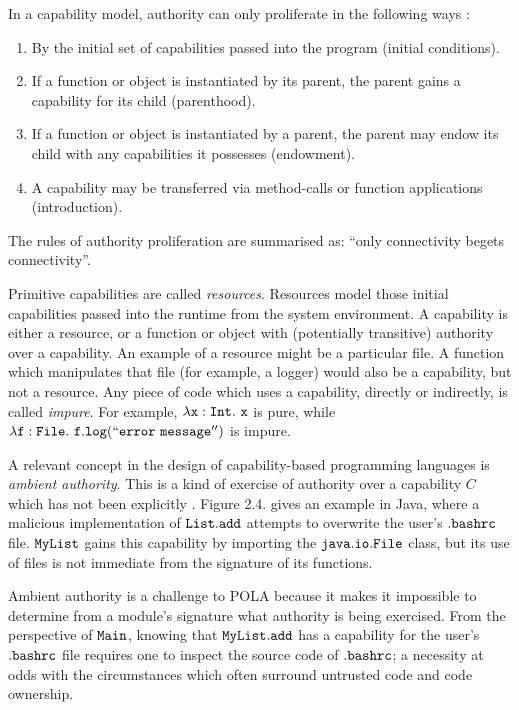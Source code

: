 In a capability model, authority can only proliferate in the following ways \cite{miller06}:

\begin{enumerate}
	\item By the initial set of capabilities passed into the program (initial conditions).
	\item If a function or object is instantiated by its parent, the parent gains a capability for its child (parenthood).
	\item If a function or object is instantiated by a parent, the parent may endow its child with any capabilities it possesses (endowment).
	\item A capability may be transferred via method-calls or function applications (introduction).
\end{enumerate}

The rules of authority proliferation are summarised as: ``only connectivity begets connectivity''.

Primitive capabilities are called \textit{resources}. Resources model those initial capabilities passed into the runtime from the system environment. A capability is either a resource, or a function or object with (potentially transitive) authority over a capability. An example of a resource might be a particular file. A function which manipulates that file (for example, a logger) would also be a capability, but not a resource. Any piece of code which uses a capability, directly or indirectly, is called \textit{impure}. For example, $\mathtt{\lambda x: \mathtt{Int} .~x}$ is pure, while $\mathtt{\lambda f: File .~f.log(``error~message'')}$ is impure.

A relevant concept in the design of capability-based programming languages is \textit{ambient authority}. This is a kind of exercise of authority over a capability $C$ which has not been explicitly \cite{miller03}. Figure 2.4. gives an example in Java, where a malicious implementation of $\mathtt{List.add}$ attempts to overwrite the user's $\mathtt{.bashrc}$ file. $\mathtt{MyList}$ gains this capability by importing the $\mathtt{java.io.File}$ class, but its use of files is not immediate from the signature of its functions.

Ambient authority is a challenge to POLA because it makes it impossible to determine from a module's signature what authority is being exercised. From the perspective of $\mathtt{Main}$, knowing that $\mathtt{MyList.add}$ has a capability for the user's $\mathtt{.bashrc}$ file requires one to inspect the source code of $\mathtt{.bashrc}$; a necessity at odds with the circumstances which often surround untrusted code and code ownership.

